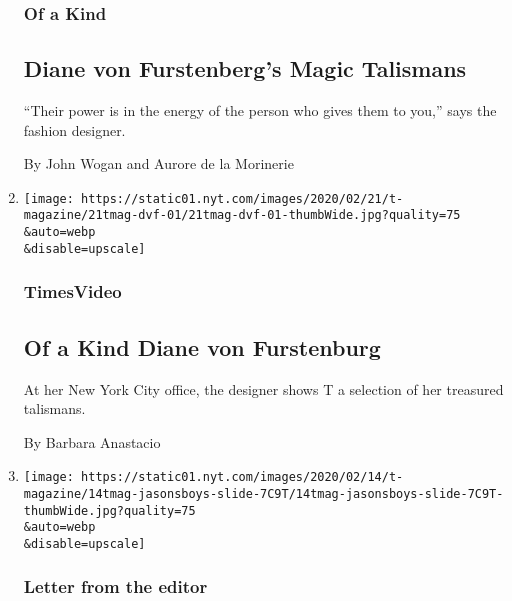 \begin{enumerate}
  \hypertarget{of-a-kind}{%
  \subsubsection{Of a Kind}\label{of-a-kind}}

  \hypertarget{diane-von-furstenbergs-magic-talismans}{%
  \subsection{Diane von Furstenberg's Magic
  Talismans}\label{diane-von-furstenbergs-magic-talismans}}

  ``Their power is in the energy of the person who gives them to you,''
  says the fashion designer.

  By John Wogan and Aurore de la Morinerie
\item
  \href{/video/t-magazine/fashion/100000006990423/of-a-kind-diane-von-furstenburg.html}{}

  \texttt{[image: https://static01.nyt.com/images/2020/02/21/t-magazine/21tmag-dvf-01/21tmag-dvf-01-thumbWide.jpg?quality=75\\\&auto=webp\\\&disable=upscale]}

  \hypertarget{timesvideo-1}{%
  \subsubsection{TimesVideo}\label{timesvideo-1}}

  \hypertarget{of-a-kind--diane-von-furstenburg}{%
  \subsection{Of a Kind \textbar{} Diane von
  Furstenburg}\label{of-a-kind--diane-von-furstenburg}}

  At her New York City office, the designer shows T a selection of her
  treasured talismans.

  By Barbara Anastacio
\item
  \href{/2020/02/21/t-magazine/spring-womens-fashion-issue.html}{}

  \texttt{[image: https://static01.nyt.com/images/2020/02/14/t-magazine/14tmag-jasonsboys-slide-7C9T/14tmag-jasonsboys-slide-7C9T-thumbWide.jpg?quality=75\\\&auto=webp\\\&disable=upscale]}

  \hypertarget{letter-from-the-editor}{%
  \subsubsection{Letter from the editor}\label{letter-from-the-editor}}


\end{enumerate}
